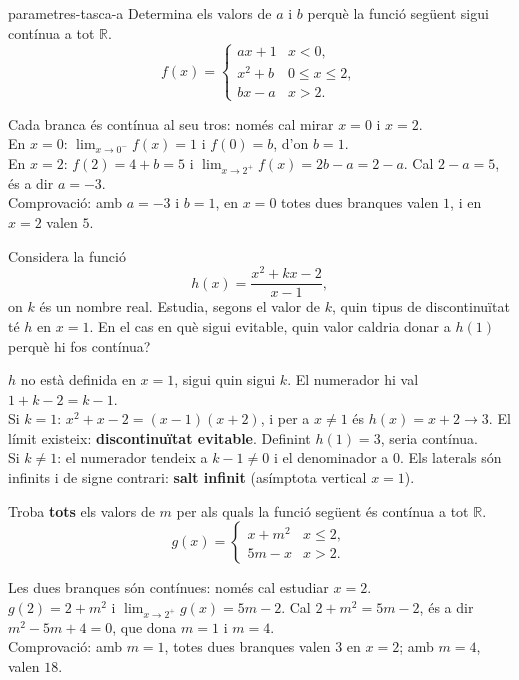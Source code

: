 \begin{apartats}

\begin{tria}{parametres-tasca-a}
Determina els valors de $a$ i $b$ perquè la funció següent sigui contínua a tot $\mathbb{R}$.
\[
f(x)=\begin{cases}
  ax+1 & \si{x<0},\\[3pt]
  x^2+b & \si{0\le x\le 2},\\[3pt]
  bx-a & \si{x>2}.
\end{cases}
\]

\begin{solucio}
Cada branca és contínua al seu tros: només cal mirar $x=0$ i $x=2$.\\
En $x=0$: $\lim_{x\to0^-}f(x)=1$ i $f(0)=b$, d'on $\boxed{b=1}$.\\
En $x=2$: $f(2)=4+b=5$ i $\lim_{x\to2^+}f(x)=2b-a=2-a$. Cal $2-a=5$, és a dir
$\boxed{a=-3}$.\\
Comprovació: amb $a=-3$ i $b=1$, en $x=0$ totes dues branques valen $1$, i en $x=2$ valen $5$.
\end{solucio}

Considera la funció
\[
h(x)=\frac{x^2+kx-2}{x-1},
\]
on $k$ és un nombre real. Estudia, segons el valor de $k$, quin tipus de discontinuïtat té
$h$ en $x=1$. En el cas en què sigui evitable, quin valor caldria donar a $h(1)$ perquè hi
fos contínua?

\begin{solucio}
$h$ no està definida en $x=1$, sigui quin sigui $k$. El numerador hi val $1+k-2=k-1$.\\
Si $k=1$: $x^2+x-2=(x-1)(x+2)$, i per a $x\ne1$ és $h(x)=x+2\to3$. El límit existeix:
\textbf{discontinuïtat evitable}. Definint $h(1)=3$, seria contínua.\\
Si $k\ne1$: el numerador tendeix a $k-1\ne0$ i el denominador a $0$. Els laterals són
infinits i de signe contrari: \textbf{salt infinit} (asímptota vertical $x=1$).
\end{solucio}
\end{tria}

\begin{nomesllarg}
Troba \textbf{tots} els valors de $m$ per als quals la funció següent és contínua a tot
$\mathbb{R}$.
\[
g(x)=\begin{cases}
  x+m^2 & \si{x\le 2},\\[3pt]
  5m-x  & \si{x>2}.
\end{cases}
\]

\begin{solucio}
Les dues branques són contínues: només cal estudiar $x=2$.\\
$g(2)=2+m^2$ i $\lim_{x\to2^+}g(x)=5m-2$. Cal $2+m^2=5m-2$, és a dir $m^2-5m+4=0$, que dona
$\boxed{m=1}$ i $\boxed{m=4}$.\\
Comprovació: amb $m=1$, totes dues branques valen $3$ en $x=2$; amb $m=4$, valen $18$.
\end{solucio}
\end{nomesllarg}

\end{apartats}

